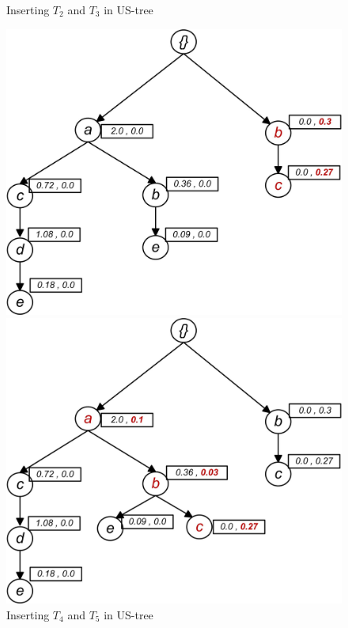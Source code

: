 \begin{figure}
\begin{minipage}{0.20\textwidth}
\end{minipage}
 \caption{Inserting $T_2$ and $T_3$ in US-tree}
 \label{figure:t23}
\end{figure}

\begin{figure}
\begin{minipage}{0.25\textwidth}
  \centering
  \includegraphics[width=\textwidth]{images/sim_04.jpg}
\end{minipage}
\hfill
\begin{minipage}{0.25\textwidth}
  \centering
  \includegraphics[width=\textwidth]{images/sim_05.jpg}
\end{minipage}
\caption{Inserting $T_4$ and $T_5$ in US-tree}
 \label{figure:t456}
\end{figure}


